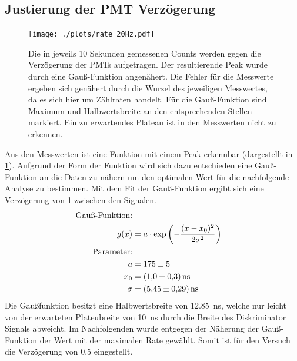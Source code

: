 \subsection{Justierung der PMT Verzögerung}


\begin{figure}[ht]
    \centering
    \texttt{[image: ./plots/rate\_20Hz.pdf]}
    \caption{Die in jeweils \num{10} Sekunden gemessenen Counts werden gegen die Verzögerung der PMTs aufgetragen. Der resultierende Peak wurde durch eine Gauß-Funktion angenähert. Die Fehler für die Messwerte ergeben sich genähert durch die Wurzel des jeweiligen Messwertes, da es sich hier um Zählraten handelt. Für die Gauß-Funktion sind Maximum und Halbwertsbreite an den entsprechenden Stellen markiert. Ein zu erwartendes Plateau ist in den Messwerten nicht zu erkennen.}
    \label{fig:rate_20Hz}
\end{figure}
Aus den Messwerten ist eine Funktion mit einem Peak erkennbar (dargestellt in \ref{fig:rate_20Hz}).
Aufgrund der Form der Funktion wird sich dazu entschieden eine Gauß-Funktion an die Daten zu nähern um den optimalen Wert für die nachfolgende Analyse zu bestimmen.
Mit dem Fit der Gauß-Funktion ergibt sich eine Verzögerung von \num{1} zwischen den Signalen.
\begin{align*}
    \text{Gauß-Funktion:}\\
    g(x) &= a \cdot \text{exp} \left(-\frac{(x-x_0)^2}{2\sigma^2}\right)\\
    \text{Parameter:}\\
    a &= \num{175 +- 5}\\
    x_0 &= \SI{1.0 +- 0.3}{\nano\second}\\
    \sigma &= \SI{5.45 +- 0.29}{\nano\second}\\
\end{align*}
Die Gaußfunktion besitzt eine Halbwertsbreite von \SI{12,85}{\nano \second}, welche nur leicht von der erwarteten Plateubreite von \SI{10}{\nano \second} durch die Breite des Diskriminator Signals abweicht.
Im Nachfolgenden wurde entgegen der Näherung der Gauß-Funktion der Wert mit der maximalen Rate gewählt.
Somit ist für den Versuch die Verzögerung von \num{0.5} eingestellt.
